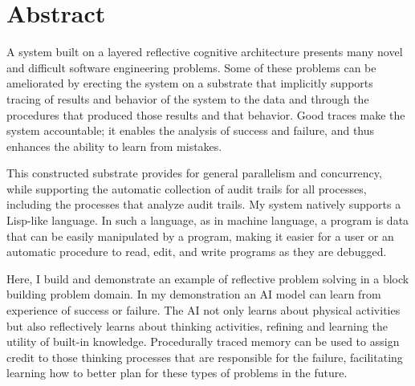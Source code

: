 \begingroup
\let\clearpage\relax
\let\cleardoublepage\relax
\let\cleardoublepage\relax

\chapter*{Abstract}

A system built on a layered reflective cognitive architecture presents
many novel and difficult software engineering problems.  Some of these
problems can be ameliorated by erecting the system on a substrate that
implicitly supports tracing of results and behavior of the system to
the data and through the procedures that produced those results and
that behavior.  Good traces make the system accountable; it enables
the analysis of success and failure, and thus enhances the ability to
learn from mistakes.

This constructed substrate provides for general parallelism and
concurrency, while supporting the automatic collection of audit trails
for all processes, including the processes that analyze audit trails.
My system natively supports a Lisp-like language.  In such a language,
as in machine language, a program is data that can be easily
manipulated by a program, making it easier for a user or an automatic
procedure to read, edit, and write programs as they are debugged.

Here, I build and demonstrate an example of reflective problem solving
in a block building problem domain.  In my demonstration an AI model
can learn from experience of success or failure.  The AI not only
learns about physical activities but also reflectively learns about
thinking activities, refining and learning the utility of built-in
knowledge.  Procedurally traced memory can be used to assign credit to
those thinking processes that are responsible for the failure,
facilitating learning how to better plan for these types of problems
in the future.

\endgroup

\vfill

